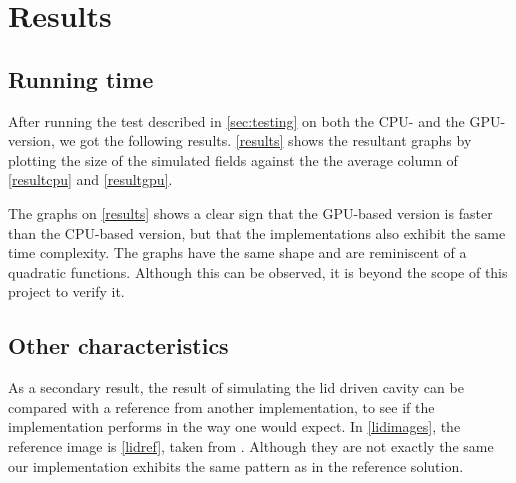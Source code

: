 \section{Results}

\subsection{Running time}\label{sec:runningtime}
After running the test described in \autoref{sec:testing} on both the CPU- and the GPU-version, we got the following results. \autoref{results} shows the resultant graphs by plotting the size of the simulated fields against the the average column of \autoref{resultcpu} and \autoref{resultgpu}.


The graphs on \autoref{results} shows a clear sign that the GPU-based version is faster than the CPU-based version, but that the implementations also exhibit the same time complexity. The graphs have the same shape and are reminiscent of a quadratic functions. Although this can be observed, it is beyond the scope of this project to verify it.



\subsection{Other characteristics}
As a secondary result, the result of simulating the lid driven cavity can be compared with a reference from another implementation, to see if the implementation performs in the way one would expect. In \autoref{lidimages}, the reference image is \autoref{lidref}, taken from \cite{lidref}. Although they are not exactly the same our implementation exhibits the same pattern as in the reference solution.


